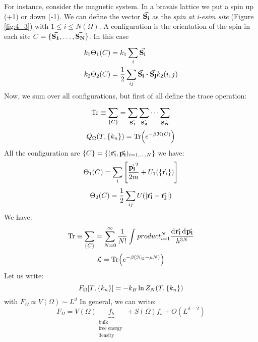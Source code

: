 \documentclass[../main/main.tex]{subfiles}
\begin{document}
For instance, consider the magnetic system. In a bravais lattice we put a spin up (+1) or down (-1). We can define the vector \( \va{S_i}  \) as the \emph{spin at i-esim site} (Figure \ref{fig:4_3}) with \( 1 \le i \le N(\Omega ) \).
A configuration is the orientation of the spin in each site \( C = \{ \va{S_1},\dots,\va{S_N} \}  \).
In this case
\begin{subequations}
\begin{align}
  k_1 \Theta _1 (C) &= k_1 \sum_{i}^{} \va{S_i}  \\
  k_2  \Theta _2 (C) &= \frac{1}{2} \sum_{ij}^{} \va{S_i} \vdot \va{S_j} k_2 (i,j)
\end{align}
\label{}
\end{subequations}
Now, we sum over all configurations, but first of all define the trace operation:
\begin{equation}
  \Tr \equiv \sum_{\{C\}}^{} = \sum_{\va{S_1} }^{} \sum_{\va{S_2} }^{}  \dots \sum_{\va{S_N} }^{}
  \label{eq:}
\end{equation}
\begin{equation}
  Q_{\Omega } (T, \{k_n\}) = \Tr(e^{-\beta \mathcal{H}(C)} )
  \label{eq:}
\end{equation}
All the configuration are \( \{C\} = \{ (\va{r_i},\va{p_i}  )_{i=1,\dots,N}\} \)
we have:
\begin{equation}
  \Theta _1 (C) = \sum_{i}^{} \qty[\frac{\va{p_i}^2 }{2m}+ U_1 (\{\va{r}_i \})]
  \label{eq:}
\end{equation}
\begin{equation}
  \Theta _2 (C) = \frac{1}{2} \sum_{ij}^{} U ( \abs{\va{r_i} - \va{r_j}  } )
  \label{eq:}
\end{equation}
We have:
\begin{equation}
  \Tr \equiv \sum_{\{C\}}^{} = \sum_{N=0}^{\infty } \frac{1}{N!} \int_{}^{} product_{i=1}^{N} \frac{\dd[]{\va{r_i} \dd[]{\va{p_i} } } }{h^{3N}}
  \label{eq:}
\end{equation}
\begin{equation}
  \mathcal{L} = \Tr(e^{-\beta (\mathcal{H}_\Omega - \mu N)} )
  \label{eq:}
\end{equation}
Let us write:
\begin{equation}
 F_\Omega [T, \{k_n\}]= -k_B \ln{Z_N} (T,\qty{k_n} )
  \label{eq:}
\end{equation}
with \( F_\Omega \propto V(\Omega ) \sim L^d \)
In general, we can write:
\begin{equation}
  F_\Omega = V (\Omega ) \underbrace{f_b }_{\substack{ \text{bulk} \\  \text{free energy } \\ \text{density}} } + S (\Omega ) f_s + O (L^{d-2})
  \label{eq:}
\end{equation}
\end{document}
